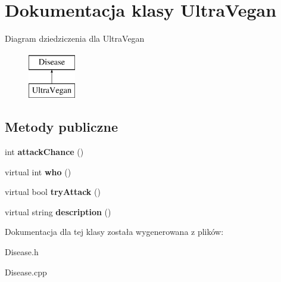 \hypertarget{classUltraVegan}{}\section{Dokumentacja klasy Ultra\+Vegan}
\label{classUltraVegan}
Diagram dziedziczenia dla Ultra\+Vegan\begin{figure}[H]
\begin{center}
\leavevmode
\includegraphics[height=2.000000cm]{classUltraVegan}
\end{center}
\end{figure}
\subsection*{Metody publiczne}
\begin{DoxyCompactItemize}
\item 
int {\bfseries attack\+Chance} ()\hypertarget{classUltraVegan_a84155389c92f4fc624722d31cd2e400f}{}\label{classUltraVegan_a84155389c92f4fc624722d31cd2e400f}

\item 
virtual int {\bfseries who} ()\hypertarget{classUltraVegan_a25c49b013633a9e9e1e8fb6a9f103f3f}{}\label{classUltraVegan_a25c49b013633a9e9e1e8fb6a9f103f3f}

\item 
virtual bool {\bfseries try\+Attack} ()\hypertarget{classUltraVegan_a40927f8fbccf4c87f0ce72b1bcd459a3}{}\label{classUltraVegan_a40927f8fbccf4c87f0ce72b1bcd459a3}

\item 
virtual string {\bfseries description} ()\hypertarget{classUltraVegan_a429d15dd51cf97460bbac469b4159998}{}\label{classUltraVegan_a429d15dd51cf97460bbac469b4159998}

\end{DoxyCompactItemize}


Dokumentacja dla tej klasy została wygenerowana z plików\+:\begin{DoxyCompactItemize}
\item 
Disease.\+h\item 
Disease.\+cpp\end{DoxyCompactItemize}
